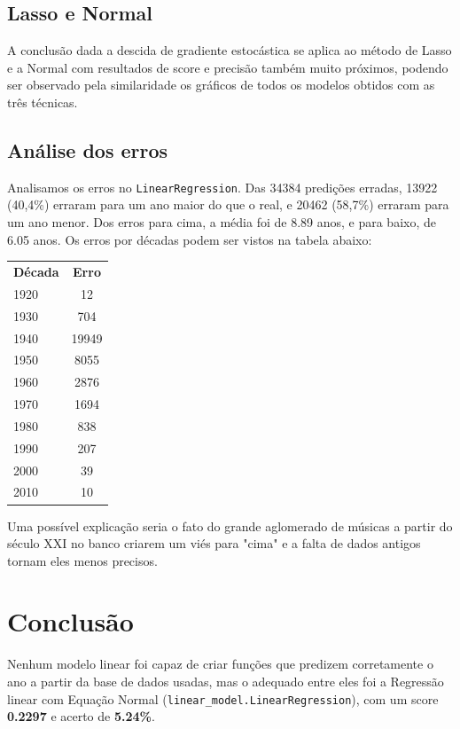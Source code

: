 \documentclass[conference]{IEEEtran}
\begin{document}
\subsection{Lasso e Normal}
  A conclusão dada a descida de gradiente estocástica se aplica ao método de Lasso e a Normal com resultados de score e precisão também muito próximos, podendo ser observado pela similaridade os gráficos de todos os modelos obtidos com as três técnicas.

\subsection{Análise dos erros}
Analisamos os erros no \texttt{LinearRegression}. Das 34384 predições erradas, 13922 (40,4\%) erraram para um ano maior do que o real, e 20462 (58,7\%) erraram para um ano menor. Dos erros para cima, a média foi de 8.89 anos, e para baixo, de 6.05 anos. Os erros por décadas podem ser vistos na tabela abaixo:

\begin{center}

\begin{tabular}{ l | c}
\textbf{Década} & \textbf{Erro} \\
1920 & 12 \\
1930 & 704 \\
1940 & 19949 \\
1950 & 8055 \\
1960 & 2876 \\
1970 & 1694 \\
1980 & 838 \\
1990 & 207 \\
2000 & 39 \\
2010 & 10
\end{tabular}

\end{center}


Uma possível explicação seria o fato do grande aglomerado de músicas a partir do século XXI no banco criarem um viés para "cima" e a falta de dados antigos tornam eles menos precisos.

\section{Conclusão}
Nenhum modelo linear foi capaz de criar funções que predizem corretamente o ano a partir da base de dados usadas, mas o adequado entre eles foi a Regressão linear com Equação Normal (\texttt{linear\_model.LinearRegression}), com um score  \textbf{0.2297} e acerto de \textbf{5.24\%}.
\end{document}
